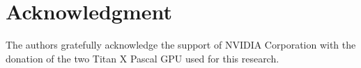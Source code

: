 \section{Acknowledgment}\label{sec:acknowledgment}
The authors gratefully acknowledge the support of NVIDIA Corporation with the donation of the two
Titan X Pascal GPU used for this research.

